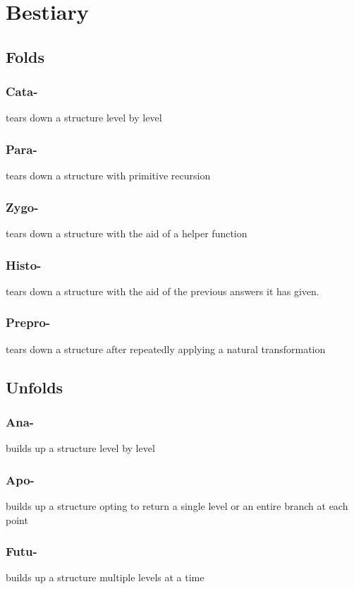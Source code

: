 \documentclass{beamer}
\begin{document}
\section{Bestiary}

\subsection{Folds}

\begin{frame}
\frametitle{Cata-}

tears down a structure level by level
\end{frame}

\begin{frame}
\frametitle{Para-}

tears down a structure with primitive recursion
\end{frame}

\begin{frame}
\frametitle{Zygo-}

tears down a structure with the aid of a helper function
\end{frame}

\begin{frame}
\frametitle{Histo-}

tears down a structure with the aid of the previous answers it has given.
\end{frame}

\begin{frame}
\frametitle{Prepro-}

tears down a structure after repeatedly applying a natural transformation
\end{frame}

\subsection{Unfolds}

\begin{frame}
\frametitle{Ana-}

builds up a structure level by level
\end{frame}

\begin{frame}
\frametitle{Apo-}

builds up a structure opting to return a single level or an entire branch at each point
\end{frame}

\begin{frame}
\frametitle{Futu-}

builds up a structure multiple levels at a time
\end{frame}
\end{document}
